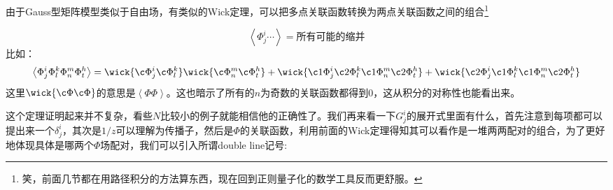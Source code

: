 由于Gauss型矩阵模型类似于自由场，有类似的Wick定理，可以把多点关联函数转换为两点关联函数之间的组合\footnote{笑，前面几节都在用路径积分的方法算东西，现在回到正则量子化的数学工具反而更舒服。}
\begin{theorem}[矩阵模型的Wick定理]
	\begin{equation}
		\left<\Phi^i_j\cdots\right>=\text{所有可能的缩并}
	\end{equation}
	比如：
	\begin{equation}
		\begin{aligned}
			\left<\Phi^i_j\Phi^k_l\Phi^m_n\Phi^h_t\right>=\wick{\c\Phi^i_j\c\Phi^k_l}\wick{\c\Phi^m_n\c\Phi^h_t}+\wick{\c1\Phi^i_j\c2\Phi^k_l\c1\Phi^m_n\c2\Phi^h_t}+\wick{\c2\Phi^i_j\c1\Phi^k_l\c1\Phi^m_n\c2\Phi^h_t}
		\end{aligned}
	\end{equation}
	这里$\wick{\c\Phi\c\Phi}$的意思是$\left<\Phi\Phi\right>$。这也暗示了所有的$n$为奇数的关联函数都得到0，这从积分的对称性也能看出来。
\end{theorem}
这个定理证明起来并不复杂，看些$N$比较小的例子就能相信他的正确性了。我们再来看一下$G^i_j$的展开式里面有什么，首先注意到每项都可以提出来一个$\delta^i_j$，其次是$1/z$可以理解为传播子，然后是$\Phi$的关联函数，利用前面的Wick定理得知其可以看作是一堆两两配对的组合，为了更好地体现具体是哪两个$\Phi$场配对，我们可以引入所谓double line记号:

